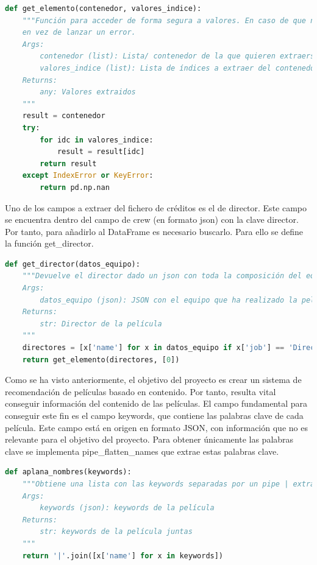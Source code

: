 \begin{lstlisting}[language=Python, caption={Acceso a los datos de forma segura. Se utiliza como proxy para no acceder directamente al valor. De esta forma, si se da un error, en vez de tener un error de ejecución se devuelve nulo.}]
def get_elemento(contenedor, valores_indice):
    """Función para acceder de forma segura a valores. En caso de que no se encuentre uno de ellos, se devuelve NaN
    en vez de lanzar un error.
    Args:
        contenedor (list): Lista/ contenedor de la que quieren extraerse los valores
        valores_indice (list): Lista de índices a extraer del contenedor
    Returns:
        any: Valores extraidos
    """
    result = contenedor
    try:
        for idc in valores_indice:
            result = result[idc]
        return result
    except IndexError or KeyError:
        return pd.np.nan
\end{lstlisting}

Uno de los campos a extraer del fichero de créditos es el de director. Este campo se encuentra dentro del campo de crew (en formato json) con la clave director. Por tanto, para añadirlo al DataFrame es necesario buscarlo. Para ello se define la función get\_director.
\begin{lstlisting}[language=Python, caption= {Obtención de una lista de directores extraídos del campo crew. Se itera por todos los miembros del equipo y se retienen únicamente aquellos que tienen el cargo de director.}]
def get_director(datos_equipo):
    """Devuelve el director dado un json con toda la composición del equipo de la película.
    Args:
        datos_equipo (json): JSON con el equipo que ha realizado la película
    Returns:
        str: Director de la película
    """
    directores = [x['name'] for x in datos_equipo if x['job'] == 'Director']
    return get_elemento(directores, [0])
\end{lstlisting}

Como se ha visto anteriormente, el objetivo del proyecto es crear un sistema de recomendación de películas basado en contenido. Por tanto, resulta vital conseguir información del contenido de las películas. El campo fundamental para conseguir este fin es el campo keywords, que contiene las palabras clave de cada película. Este campo está en origen en formato JSON, con información que no es relevante para el objetivo del proyecto. Para obtener únicamente las palabras clave se implementa pipe\_flatten\_names que extrae estas palabras clave.
\begin{lstlisting}[language=Python, caption= {Extracción de las palabras clave a partir del JSON del DataFrame. }]
def aplana_nombres(keywords):
    """Obtiene una lista con las keywords separadas por un pipe | extrayéndolas del json.
    Args:
        keywords (json): keywords de la película
    Returns:
        str: keywords de la película juntas
    """
    return '|'.join([x['name'] for x in keywords])
\end{lstlisting}

